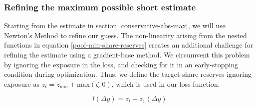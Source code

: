 
\subsubsection{Refining the maximum possible short estimate}\label{newton-refinement}

Starting from the estimate in section \ref{conservative-abs-max}, we will use Newton's Method to refine our guess.
The non-linearity arising from the nested  functions in equation \eqref{pool-min-share-reserves} creates an additional challenge for refining the estimate using a gradient-base method.
We circumvent this problem by ignoring the exposure in the loss, and checking for it in an early-stopping condition during optimization.
Thus, we define the target share reserves ignoring exposure as $z_t = z_\text{min} + \text{max}(\zeta, 0)$, which is used in our loss function:

\begin{equation}\label{newton-loss}
    l(\Delta y) = z_t - z_1(\Delta y)
\end{equation}

